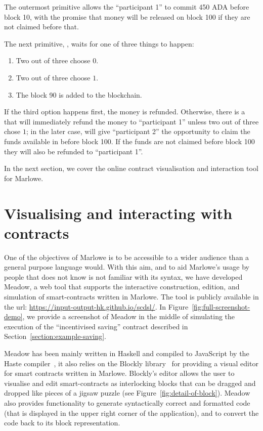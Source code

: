 \documentclass[
      acmsmall
    , screen
  ]{acmart}
\begin{document}
The outermost primitive  allows the ``participant 1'' to commit 450 ADA before block 10, 
with the promise that money will be released on block 100 if they are not claimed before that.

The next primitive, , waits for one of three things to happen:
\begin{enumerate}
 \item Two out of three choose $0$.
 \item Two out of three choose $1$.
 \item The block 90 is added to the blockchain.
\end{enumerate}

If the third option happens first, the money is refunded. Otherwise, there is a  that will 
immediately refund the money to ``participant 1'' unless two out of three chose $1$; in the later case, 
 will give ``participant 2'' the opportunity to claim the funds available in  
before block 100. If the funds are not claimed before block 100 they will also be refunded to ``participant 1''.

In the next section, we cover the online contract visualisation and interaction tool for Marlowe.

\section{Visualising and interacting with contracts}

\label{section:tool}

One of the objectives of Marlowe is to be accessible to a wider audience
than a general purpose language would. With this aim, and to aid Marlowe's
usage by people that does not know is not familiar with its syntax,
we have developed Meadow, a web tool that supports the interactive construction,
edition, and simulation of smart-contracts written in Marlowe. The
tool is publicly available in the url: \url{https://input-output-hk.github.io/scdsl/}.
In Figure~\ref{fig:full-screenshot-demo}, we provide a screenshot
of Meadow in the middle of simulating the execution of the ``incentivised
saving'' contract described in Section~\ref{section:example-saving}.

Meadow has been mainly written in Haskell and compiled to JavaScript
by the Haste compiler~\cite{Haste}, it also relies on
the Blockly library~\cite{Blockly} for providing a visual
editor for smart contracts written in Marlowe. Blockly's editor allows
the user to visualise and edit smart-contracts as interlocking blocks
that can be dragged and dropped like pieces of a jigsaw puzzle (see
Figure~\ref{fig:detail-of-block}). Meadow also provides functionality
to generate syntactically correct and formatted code (that is displayed
in the upper right corner of the application), and to convert the
code back to its block representation.
\end{document}
